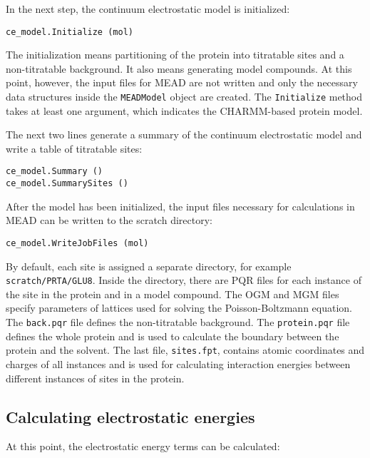 \documentclass[a4paper,11pt]{article}
\begin{document}
{\bigskip
In the next step, the continuum electrostatic model is initialized:

{\footnotesize \begin{lstlisting}
ce_model.Initialize (mol)
\end{lstlisting} }

\bigskip
The initialization means partitioning of the protein into titratable sites and
a non-titratable background.
%
It also means generating model compounds.
%
At this point, however, the input files for MEAD are not written and only
the necessary data structures inside the \texttt{MEADModel} object are created.
%
The \texttt{Initialize} method takes at least one argument,
which indicates the CHARMM-based protein model.

\bigskip
The next two lines generate a summary of the continuum electrostatic model and
write a table of titratable sites:

{\footnotesize \begin{lstlisting}
ce_model.Summary ()
ce_model.SummarySites ()
\end{lstlisting} }

\bigskip
After the model has been initialized, the input files necessary for calculations in MEAD
can be written to the scratch directory:

{\footnotesize \begin{lstlisting}
ce_model.WriteJobFiles (mol)
\end{lstlisting} }

By default, each site is assigned a separate directory, for example
\texttt{scratch/PRTA/GLU8}.
%
Inside the directory, there are PQR files for each instance of the site in the protein
and in a model compound.
%
The OGM and MGM files specify parameters of lattices used for solving the Poisson-Boltzmann equation.
%
The \texttt{back.pqr} file defines the non-titratable background.
%
The \texttt{protein.pqr} file defines the whole protein and is used to calculate the boundary
between the protein and the solvent.
%
The last file, \texttt{sites.fpt}, contains atomic coordinates and charges of all instances
and is used for calculating interaction energies between
different instances of sites in the protein.


\subsection{Calculating electrostatic energies}
At this point, the electrostatic energy terms can be calculated:

}
\end{document}

